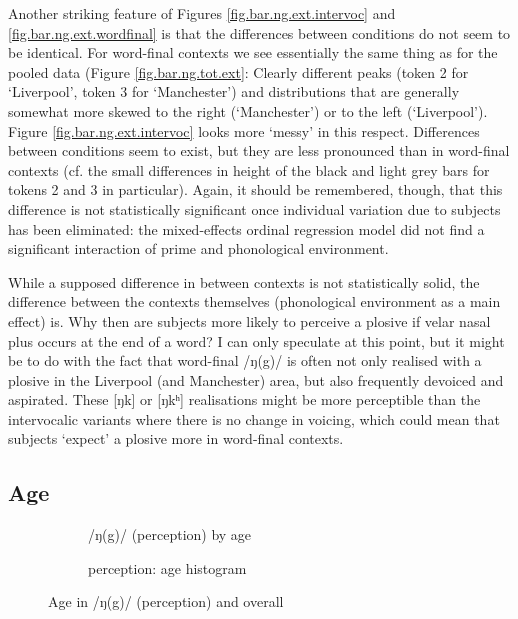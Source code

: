 Another striking feature of Figures \ref{fig.bar.ng.ext.intervoc} and \ref{fig.bar.ng.ext.wordfinal} is that the differences between  conditions do not seem to be identical.
For word-final contexts we see essentially the same thing as for the pooled data (Figure \ref{fig.bar.ng.tot.ext}: Clearly different peaks (token 2 for `Liverpool', token 3 for `Manchester') and distributions that are generally somewhat more skewed to the right (`Manchester') or to the left (`Liverpool').
Figure \ref{fig.bar.ng.ext.intervoc} looks more `messy' in this respect.
Differences between  conditions seem to exist, but they are less pronounced than in word-final contexts (cf. the small differences in height of the black and light grey bars for tokens 2 and 3 in particular).
Again, it should be remembered, though, that this difference is not statistically significant once individual variation due to subjects has been eliminated: the mixed-effects ordinal regression model did not find a significant interaction of prime and phonological environment.

While a supposed difference in  between contexts is not statistically solid, the difference between the contexts themselves (phonological environment as a main effect) is.
Why then are subjects more likely to perceive a plosive if velar nasal plus occurs at the end of a word?
I can only speculate at this point, but it might be to do with the fact that word-final /ŋ(g)/ is often not only realised with a plosive in the Liverpool (and Manchester) area, but also frequently devoiced and aspirated.
These [ŋk] or [ŋkʰ] realisations might be more perceptible than the intervocalic variants where there is no change in voicing, which could mean that subjects `expect' a plosive more in word-final contexts.

\subsection{Age}
\label{sec.perc_res.ng.age}

\begin{figure}[h]
	\centering
	\begin{subfigure}{.49\textwidth}
		\centering
			\resizebox{\linewidth}{!}{} 
		\caption{/ŋ(g)/ (perception)  by age}
		\label{fig.scatter.ng.ext.age}
	\end{subfigure}
	\begin{subfigure}{.49\textwidth}
		\centering
			\resizebox{\linewidth}{!}{} 
		\caption{perception: age histogram}
		\label{fig.hist.ext.age}
	\end{subfigure}			
	\caption{Age in /ŋ(g)/ (perception) and overall}
\end{figure}

